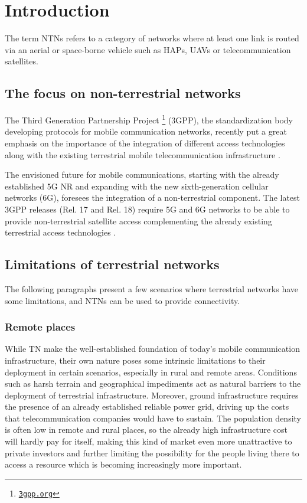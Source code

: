
\chapter{Introduction}
\label{chp:intro}

The term \ac{NTNs} refers to a category of networks where at least one link is routed via an aerial or space-borne vehicle such as \ac{HAPs}, \ac{UAVs} or telecommunication satellites.

\section{The focus on non-terrestrial networks}
The Third Generation Partnership Project \footnote{\href{https://www.3gpp.org}{\texttt{3gpp.org}}} (3GPP), the standardization body developing protocols for mobile communication networks, recently put a great emphasis on the importance of the integration of different access technologies along with the existing terrestrial mobile telecommunication infrastructure \cite{3gpp-tr-21.917}.

The envisioned future for mobile communications, starting with the already established 5G \ac{NR} and expanding with the new sixth-generation cellular networks (6G), foresees the integration of a non-terrestrial component. The latest \ac{3GPP} releases (Rel. 17 and Rel. 18) require 5G and 6G networks to be able to provide non-terrestrial satellite access complementing the already existing terrestrial access technologies \cite{overview-rel-17-18-saad} \cite{5g-nr-communication-geo-leo-maattanen}.

\section{Limitations of terrestrial networks}
The following paragraphs present a few scenarios where terrestrial networks have some limitations, and \ac{NTNs} can be used to provide connectivity.

\subsection{Remote places}
While \ac{TN} make the well-established foundation of today’s mobile communication infrastructure, their own nature poses some intrinsic limitations to their deployment in certain scenarios, especially in rural and remote areas. Conditions such as harsh terrain and geographical impediments act as natural barriers to the deployment of terrestrial infrastructure. Moreover, ground infrastructure requires the presence of an already established reliable power grid, driving up the costs that telecommunication companies would have to sustain.
The population density is often low in remote and rural places, so the already high infrastructure cost will hardly pay for itself, making this kind of market even more unattractive to private investors and further limiting the possibility for the people living there to access a resource which is becoming increasingly more important.

